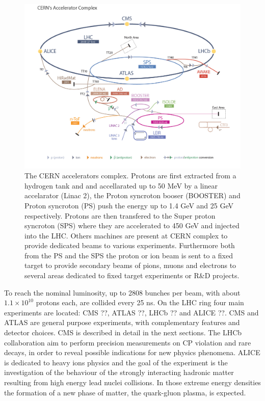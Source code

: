 \begin{figure}[!h]
  \includegraphics[width = 1.\textwidth]{figures/cms/LHC_accelarator_complex.jpg}
  \caption{The CERN accelerators complex. Protons are first extracted from a hydrogen tank and and accellarated up to 50 MeV by
    a linear accelarator (Linac 2), the Proton syncroton booser (BOOSTER) and Proton syncroton (PS) push the energy up to
    1.4 GeV and 25 GeV respectively. Protons are then transfered to the Super proton syncroton (SPS) where they are accelerated to
    450 GeV and injected into the LHC. Others machines are present at CERN complex to provide dedicated beams to various experiments.
    Furthermore both from the PS and the SPS the proton or ion beam is sent to a fixed target to provide secondary beams of pions, muons and electrons to several areas dedicated to fixed target experiments or R\&D projects. 
  }
  \label{fig:lhc_chain}  
\end{figure}

To reach the nominal luminosity, up to 2808 bunches per beam, with about $1.1\times 10^{10}$
protons each, are collided every 25 ns.
On the LHC ring four main experiments are located: CMS ??, ATLAS ??, LHCb ?? and
ALICE ??. CMS and ATLAS are general purpose experiments, with complementary features
and detector choices. CMS is described in detail in the next sections. The LHCb collaboration
aim to perform precision measurements on CP violation and rare decays, in order to reveal
possible indications for new physics phenomena. ALICE is dedicated to heavy ions physics and the
goal of the experiment is the investigation of the behaviour of the strongly interacting hadronic
matter resulting from high energy lead nuclei collisions. In those extreme energy densities the
formation of a new phase of matter, the quark-gluon plasma, is expected.

